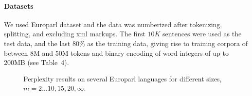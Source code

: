 
\paragraph{Datasets}
We used Europarl dataset and the data was numberized after tokenizing, splitting, and excluding xml markups. The first $10K$ sentences were used as the test data, and the last 80\% as the training data, giving rise to training corpora of between 8M and 50M tokens and binary encoding of word integers of up to 200MB (see \supp Table~4).


\begin{figure}[tb]

\caption{Perplexity results on several Europarl languages for different \ngram sizes, $m=2\ldots10,15,20,\infty$.}
\label{fig:pplx}
\end{figure}


